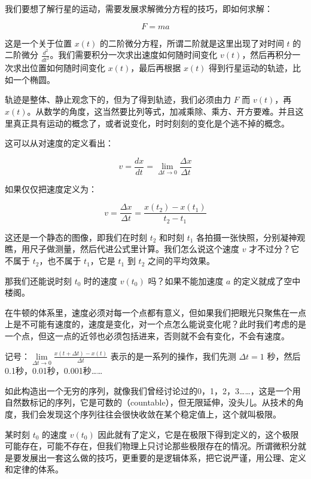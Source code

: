 我们要想了解行星的运动，需要发展求解微分方程的技巧，即如何求解：

\begin{equation}
F=ma
\end{equation}


这是一个关于位置 $x(t)$ 的二阶微分方程，所谓二阶就是这里出现了对时间 $t$ 的二阶微分 $\frac{d^2 }{ dt^2 }$。我们需要积分一次求出速度如何随时间变化 $v(t)$，然后再积分一次求出位置如何随时间变化 $x(t)$，最后再根据 $x(t)$ 得到行星运动的轨迹，比如一个椭圆。

轨迹是整体、静止观念下的，但为了得到轨迹，我们必须由力 $F$ 而 $v(t)$，再 $x(t)$。从数学的角度，这当然要比列等式，加减乘除、乘方、开方要难。并且这里真正具有运动的概念了，或者说变化，时时刻刻的变化是个逃不掉的概念。

这可以从对速度的定义看出：

\begin{equation}
v = \frac{d x }{d t} = \lim\limits_{\Delta t \to 0} \frac{\Delta x}{\Delta t}
\end{equation}

如果仅仅把速度定义为：

\begin{equation}
v = \frac{\Delta x}{\Delta t} = \frac{ x(t_2) - x(t_1) }{ t_2 - t_1 }
\end{equation}

这还是一个静态的图像，即我们在时刻 $t_2$ 和时刻 $t_1$ 各拍摄一张快照，分别凝神观瞧，用尺子做测量，然后代进公式里计算。我们怎么说这个速度 $v$ 才不过分？它不属于 $t_2$，也不属于 $t_1$，它是 $t_1$ 到 $t_2$ 之间的平均效果。

那我们还能说时刻 $t_0$ 时的速度 $v(t_0)$ 吗？如果不能加速度 $a$ 的定义就成了空中楼阁。

在牛顿的体系里，速度必须对每一个点都有意义，但如果我们把眼光只聚焦在一点上是不可能有速度的，速度是变化，对一个点怎么能说变化呢？此时我们考虑的是一个点，但这一点的近邻也必须包括进来，否则就不会有变化，不会有速度。

记号：$\lim\limits_{\Delta t \to 0} \frac{ x(t + \Delta t) - x(t) }{\Delta t}$ 表示的是一系列的操作，我们先测 $\Delta t = 1$ 秒，然后0.1秒，0.01秒，0.001秒……

如此构造出一个无穷的序列，就像我们曾经讨论过的0，1，2，3……，这是一个用自然数标记的序列，它是可数的（countable），但无限延伸，没头儿。从技术的角度，我们会发现这个序列往往会很快收敛在某个稳定值上，这个就叫极限。


某时刻 $t_0$ 的速度 $v(t_0)$ 因此就有了定义，它是在极限下得到定义的，这个极限可能存在，可能不存在，但我们物理上只讨论那些极限存在的情况。所谓微积分就是要发展出一套这么做的技巧，更重要的是逻辑体系，把它说严谨，用公理、定义和定律的体系。

